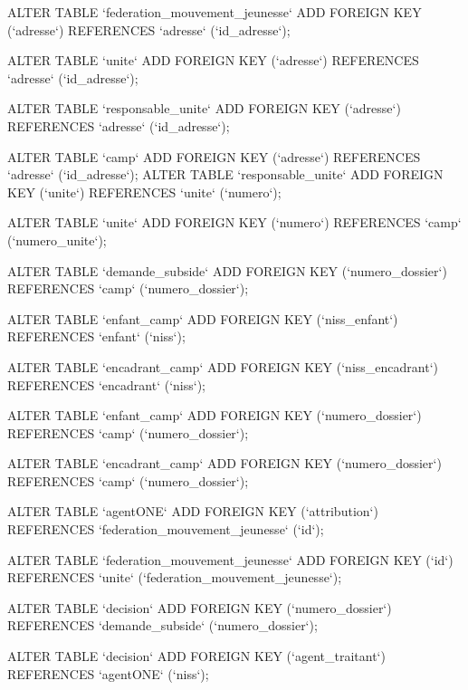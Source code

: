 ALTER TABLE `federation_mouvement_jeunesse` ADD FOREIGN KEY (`adresse`) REFERENCES `adresse` (`id_adresse`);

ALTER TABLE `unite` ADD FOREIGN KEY (`adresse`) REFERENCES `adresse` (`id_adresse`);

ALTER TABLE `responsable_unite` ADD FOREIGN KEY (`adresse`) REFERENCES `adresse` (`id_adresse`);

ALTER TABLE `camp` ADD FOREIGN KEY (`adresse`) REFERENCES `adresse` (`id_adresse`);
ALTER TABLE `responsable_unite` ADD FOREIGN KEY (`unite`) REFERENCES `unite` (`numero`);

ALTER TABLE `unite` ADD FOREIGN KEY (`numero`) REFERENCES `camp` (`numero_unite`);

ALTER TABLE `demande_subside` ADD FOREIGN KEY (`numero_dossier`) REFERENCES `camp` (`numero_dossier`);

ALTER TABLE `enfant_camp` ADD FOREIGN KEY (`niss_enfant`) REFERENCES `enfant` (`niss`);

ALTER TABLE `encadrant_camp` ADD FOREIGN KEY (`niss_encadrant`) REFERENCES `encadrant` (`niss`);

ALTER TABLE `enfant_camp` ADD FOREIGN KEY (`numero_dossier`) REFERENCES `camp` (`numero_dossier`);

ALTER TABLE `encadrant_camp` ADD FOREIGN KEY (`numero_dossier`) REFERENCES `camp` (`numero_dossier`);

ALTER TABLE `agentONE` ADD FOREIGN KEY (`attribution`) REFERENCES `federation_mouvement_jeunesse` (`id`);

ALTER TABLE `federation_mouvement_jeunesse` ADD FOREIGN KEY (`id`) REFERENCES `unite` (`federation_mouvement_jeunesse`);

ALTER TABLE `decision` ADD FOREIGN KEY (`numero_dossier`) REFERENCES `demande_subside` (`numero_dossier`);

ALTER TABLE `decision` ADD FOREIGN KEY (`agent_traitant`) REFERENCES `agentONE` (`niss`);